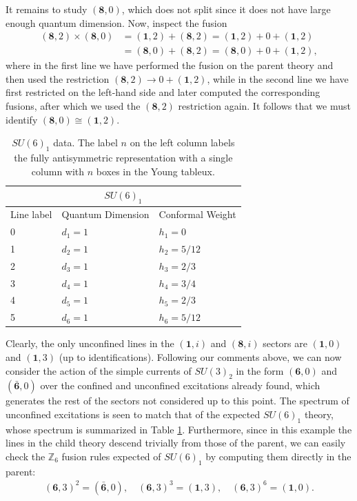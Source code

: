 \documentclass[11pt]{article}
\numberwithin{equation}{section}
\begin{document}
It remains to study $(\mathbf{8},0)$, which does not split since it does not have large enough quantum dimension. Now, inspect the fusion
\begin{align}
    (\mathbf{8},2) \times (\mathbf{8},0) &= (\mathbf{1},2) + (\mathbf{8},2) = (\mathbf{1},2) + 0 + (\mathbf{1},2) \\[0.3cm] &= (\mathbf{8},0) + (\mathbf{8},2) = (\mathbf{8},0) + 0 + (\mathbf{1},2),
\end{align}
where in the first line we have performed the fusion on the parent theory and then used the restriction $(\mathbf{8},2) \to 0 + (\mathbf{1},2)$, while in the second line we have first restricted on the left-hand side and later computed the corresponding fusions, after which we used the $(\mathbf{8},2)$ restriction again. It follows that we must identify $(\mathbf{8},0) \cong (\mathbf{1},2)$.


\begin{table}[t]
\centering
\begin{tabular}[h]{|p{4cm}|p{4cm}|p{4cm}| }
\hline 
\multicolumn{3}{|c|}{$SU(6)_{1}$} \\
\hline
Line label & Quantum Dimension & Conformal Weight  \\
\hline
0 & $d_{1} = 1$ & $h_{1}=0$ \\
1 & $d_{2} = 1$ & $h_{2}=5/12$ \\
2 & $d_{3} = 1$ & $h_{3}=2/3$ \\
3 & $d_{4} = 1$ & $h_{4}=3/4$ \\
4 & $d_{5} = 1$ & $h_{5}=2/3$ \\
5 & $d_{6} = 1$ & $h_{6}=5/12$ \\
\hline
\end{tabular}
\caption{$SU(6)_{1}$ data. The label $n$ on the left column labels the fully antisymmetric representation with a single column with $n$ boxes in the Young tableux.}  \label{su6lv1table}
\end{table}


Clearly, the only unconfined lines in the $(\mathbf{1},i)$ and $(\mathbf{8},i)$ sectors are $(\mathbf{1},0)$ and $(\mathbf{1},3)$ (up to identifications). Following our comments above, we can now consider the action of the simple currents of $SU(3)_{2}$ in the form $(\mathbf{6},0)$ and $(\mathbf{\bar{6}},0)$ over the confined and unconfined excitations already found, which generates the rest of the sectors not considered up to this point. The spectrum of unconfined excitations is seen to match that of the expected $SU(6)_{1}$ theory, whose spectrum is summarized in Table \ref{su6lv1table}. Furthermore, since in this example the lines in the child theory descend trivially from those of the parent, we can easily check the $\mathbb{Z}_{6}$ fusion rules expected of $SU(6)_{1}$ by computing them directly in the parent:
\begin{align}
    (\mathbf{6},3)^{2} = (\bar{\mathbf{6}},0), \quad (\mathbf{6},3)^{3} = (\mathbf{1},3), \quad (\mathbf{6},3)^{6} = (\mathbf{1},0).
\end{align}
\end{document}
